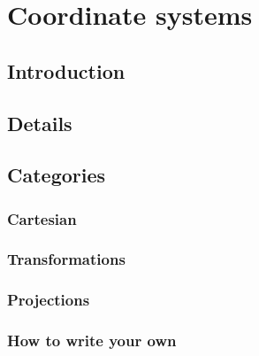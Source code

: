 

\chapter{Coordinate systems}

\section{Introduction}\label{sec:introduction}
\section{Details}\label{sec:details}
\section{Categories}\label{sec:categories}

\subsection{Cartesian}\label{sub:aggregation}
\subsection{Transformations}\label{sub:transformations}
\subsection{Projections}\label{sub:modelling}

\subsection{How to write your own}\label{sub:how_to_write_your_own} 



